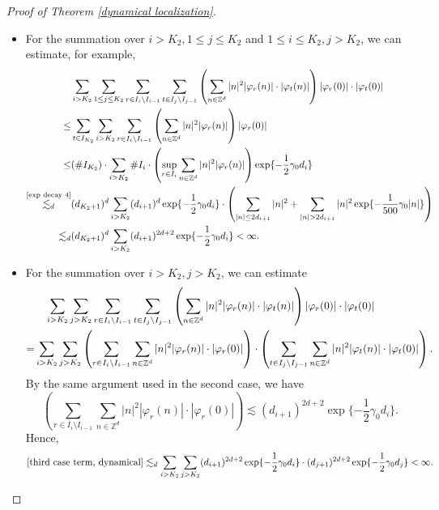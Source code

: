 \documentclass[11pt,reqno,UTF8,twoside]{amsart}
\newcommand{\Z}{\mathbb{Z}}
\theoremstyle{definition}
\numberwithin{equation}{section}
\begin{document}
\begin{proof}[Proof of Theorem \ref{dynamical localization}]
\begin{itemize}
    \item For the summation over ${ i > K_2}, {1\leq j\leq K_2}$ and ${1\leq i \leq K_2}, {j> K_2}$, we can estimate, for example,
          \begin{align*}
            &\sum_{ i > K_2} \sum_{1\leq j\leq K_2}  \sum_{r\in I_i\setminus I_{i-1}} \sum_{t\in I_{j}\setminus I_{j-1}} \left( \sum_{n\in \Z^d}  |n|^2 |\varphi_r(n)|\cdot |\varphi_t(n)|\right) |\varphi_r(0)| \cdot | \varphi_t(0)| \\
                    \leq &   \sum_{t\in I_{K_2}} \sum_{ i > K_2}   \sum_{r\in I_i\setminus I_{i-1}} \left( \sum_{n\in \Z^d}  |n|^2 |\varphi_r(n)| \right) |\varphi_r(0)| \\
                    \leq & (\# I_{K_2})  \cdot\sum_{ i > K_2} \# I_i \cdot  \left( \sup_{r\in I_{i}}   \sum_{n\in \Z^d}  |n|^2 |\varphi_r(n)| \right)  \exp\{-\frac{1}{2}\gamma_0 d_i\} \\
                    \overset{\text{\eqref{exp decay 4}}}{\lesssim_d } & (d_{K_2+1})^{d} \sum_{ i > K_2} (d_{i+1})^d   \exp\{-\frac{1}{2}\gamma_0 d_i\} \cdot  \left( \sum_{|n|\leq 2d_{i+1} }|n|^2 +\sum_{|n|>2d_{i+1}} |n|^2 \exp\{-\frac{1}{500}\gamma_0 |n|\} \right)\\
                    \lesssim_d & (d_{K_2+1})^{d} \sum_{ i > K_2} (d_{i+1})^{2d+2}  \exp\{-\frac{1}{2}\gamma_0 d_i\} <\infty.
          \end{align*}
     \item For the summation over ${i > K_2}, { j> K_2}$, we can estimate 
          \begin{align}\label{third case term, dynamical}
          \notag  &\ \ \ \sum_{i > K_2} \sum_{ j> K_2}  \sum_{r\in I_i\setminus I_{i-1}} \sum_{t\in I_{j}\setminus I_{j-1}} \left( \sum_{n\in \Z^d}  |n|^2 |\varphi_r(n)|\cdot |\varphi_t(n)|\right) |\varphi_r(0)| \cdot | \varphi_t(0)| \\
                    =&  \sum_{i > K_2} \sum_{ j> K_2} \left( \sum_{r\in I_i\setminus I_{i-1}}  \sum_{n\in \Z^d}  |n|^2 |\varphi_r(n)|\cdot |\varphi_r(0)|\right)  \cdot  \left( \sum_{t\in I_j\setminus I_{j-1}}  \sum_{n\in \Z^d}  |n|^2 |\varphi_t(n)|\cdot |\varphi_t(0)|\right).
          \end{align}
          By the same argument used in the second case, we have 
          \begin{equation*}
             \left( \sum_{r\in I_i\setminus I_{i-1}}  \sum_{n\in \Z^d}  |n|^2 |\varphi_r(n)|\cdot |\varphi_r(0)|\right)\lesssim (d_{i+1})^{2d+2} \exp\{-\frac{1}{2}\gamma_0 d_i\}.
          \end{equation*}
          Hence, 
          \begin{equation*}
            \text{\eqref{third case term, dynamical}} \lesssim_d \sum_{i > K_2} \sum_{ j> K_2} (d_{i+1})^{2d+2} \exp\{-\frac{1}{2}\gamma_0 d_i\}\cdot (d_{j+1})^{2d+2} \exp\{-\frac{1}{2}\gamma_0 d_j\}<\infty.
          \end{equation*}



\end{itemize}
\end{proof}
\end{document}
